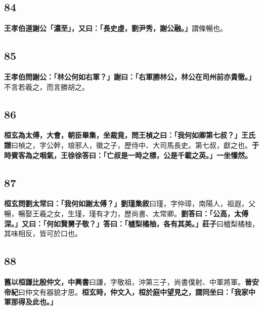 \subsection*{84}

\textbf{王孝伯道謝公「濃至」，又曰：「長史虛，劉尹秀，謝公融。」}{\footnotesize 謂條暢也。}

\subsection*{85}

\textbf{王孝伯問謝公：「林公何如右軍？」謝曰：「右軍勝林公，林公在司州前亦貴徹。」}{\footnotesize 不言若羲之，而言勝胡之。}

\subsection*{86}

\textbf{桓玄為太傅，大會，朝臣畢集，坐裁竟，問王楨之曰：「我何如卿第七叔？」}{\footnotesize \textbf{王氏譜}曰楨之，字公幹，琅邪人，徽之子，歷侍中、大司馬長史。第七叔，獻之也。}\textbf{于時賓客為之咽氣，王徐徐答曰：「亡叔是一時之標，公是千載之英。」一坐懽然。}

\subsection*{87}

\textbf{桓玄問劉太常曰：「我何如謝太傅？」}{\footnotesize \textbf{劉瑾集敘}曰瑾，字仲璋，南陽人，祖遐，父暢，暢娶王羲之女，生瑾，瑾有才力，歷尚書、太常卿。}\textbf{劉答曰：「公高，太傅深。」又曰：「何如賢舅子敬？」答曰：「樝梨橘柚，各有其美。」}{\footnotesize \textbf{莊子}曰樝梨橘柚，其味相反，皆可於口也。}

\subsection*{88}

\textbf{舊以桓謙比殷仲文，}{\footnotesize \textbf{中興書}曰謙，字敬祖，沖第三子，尚書僕射、中軍將軍。\textbf{晉安帝紀}曰仲文有器貌才思。}\textbf{桓玄時，仲文入，桓於庭中望見之，謂同坐曰：「我家中軍那得及此也。」}